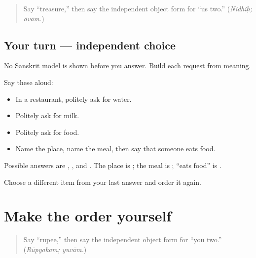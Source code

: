 \label{lesson:SA-C265-mixed-order-practice}



\begin{quote}
Say “treasure,” then say the independent object form for “us two.” (\emph{Nidhiḥ; āvām.})
\end{quote}

\subsection*{Your turn — independent choice}
No Sanskrit model is shown before you answer. Build each request from meaning.

Say these aloud:

\begin{itemize}
\raggedright
  \item In a restaurant, politely ask for water.
  \item Politely ask for milk.
  \item Politely ask for food.
  \item Name the place, name the meal, then say that someone eats food.
\end{itemize}

\begin{grammarlens}[title={What you've built}]
Possible answers are \textbf{   }, \textbf{   }, and \textbf{   }. The place is \textbf{}; the meal is \textbf{}; “eats food” is \textbf{ }.
\end{grammarlens}

\begin{tcolorbox}[breakable,colback=teal!4,colframe=teal!35!black,title={Before you move on}]
Choose a different item from your last answer and order it again.
\end{tcolorbox}
\section[Practice]{Make the order yourself}

\label{lesson:SA-C265-restaurant-order-retrieval}



\begin{quote}
Say “rupee,” then say the independent object form for “you two.” (\emph{Rūpyakam; yuvām.})
\end{quote}

